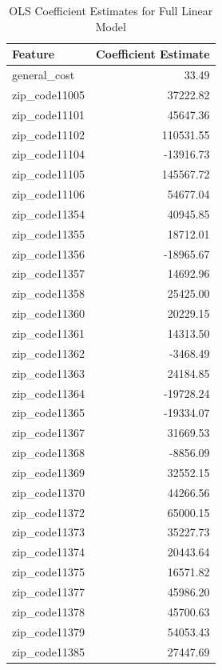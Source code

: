 \documentclass[12pt]{article}
\begin{document}
\begin{table}[H]
\centering
\renewcommand{\arraystretch}{1.2}
\begin{tabular}{|l|r|}
\hline
\textbf{Feature} & \textbf{Coefficient Estimate} \\
\hline
general\_cost & 33.49 \\
zip\_code11005 & 37222.82 \\
zip\_code11101 & 45647.36 \\
zip\_code11102 & 110531.55 \\
zip\_code11104 & -13916.73 \\
zip\_code11105 & 145567.72 \\
zip\_code11106 & 54677.04 \\
zip\_code11354 & 40945.85 \\
zip\_code11355 & 18712.01 \\
zip\_code11356 & -18965.67 \\
zip\_code11357 & 14692.96 \\
zip\_code11358 & 25425.00 \\
zip\_code11360 & 20229.15 \\
zip\_code11361 & 14313.50 \\
zip\_code11362 & -3468.49 \\
zip\_code11363 & 24184.85 \\
zip\_code11364 & -19728.24 \\
zip\_code11365 & -19334.07 \\
zip\_code11367 & 31669.53 \\
zip\_code11368 & -8856.09 \\
zip\_code11369 & 32552.15 \\
zip\_code11370 & 44266.56 \\
zip\_code11372 & 65000.15 \\
zip\_code11373 & 35227.73 \\
zip\_code11374 & 20443.64 \\
zip\_code11375 & 16571.82 \\
zip\_code11377 & 45986.20 \\
zip\_code11378 & 45700.63 \\
zip\_code11379 & 54053.43 \\
zip\_code11385 & 27447.69 \\
\hline
\end{tabular}
\caption{OLS Coefficient Estimates for Full Linear Model}
\label{tab:ols_full_coeff}
\end{table}
\end{document}
